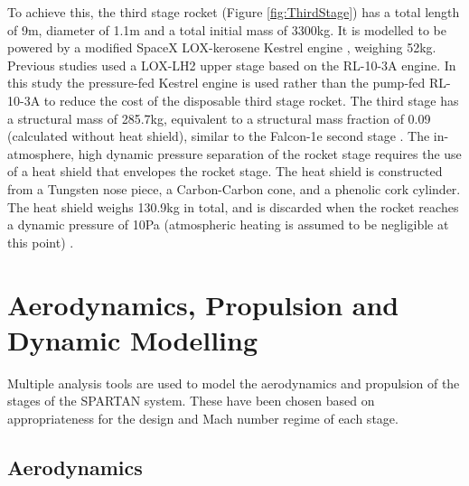 \documentclass[journal]{new-aiaa}
\begin{document}
To achieve this, the third stage rocket (Figure \ref{fig:ThirdStage}) has a total length of 9m, diameter of 1.1m and a total initial mass of 3300kg. It is modelled to be powered by a modified SpaceX LOX-kerosene Kestrel engine \cite{Vehicle2008}, weighing 52kg. Previous studies used a LOX-LH2 upper stage based on the RL-10-3A engine\cite{Preller2017}. In this study the pressure-fed Kestrel engine is used rather than the pump-fed RL-10-3A to reduce the cost of the disposable third stage rocket. The third stage has a structural mass of 285.7kg, equivalent to a structural mass fraction of 0.09 (calculated without heat shield), similar to the Falcon-1e second stage \cite{Vehicle2008}. The in-atmosphere, high dynamic pressure separation of the rocket stage requires the use of a heat shield that envelopes the rocket stage. The heat shield is constructed from a Tungsten nose piece, a Carbon-Carbon cone, and a phenolic cork cylinder. The heat shield weighs 130.9kg in total, and is discarded when the rocket reaches a dynamic pressure of 10Pa (atmospheric heating is assumed to be negligible at this point) \cite{Preller2015a,Preller2017}. 


\section{Aerodynamics, Propulsion and Dynamic Modelling}\label{section:aero}

Multiple analysis tools are used to model the aerodynamics and propulsion of the stages of the SPARTAN system. These have been chosen based on appropriateness for the design and Mach number regime of each stage. 

\subsection{Aerodynamics}
\end{document}
